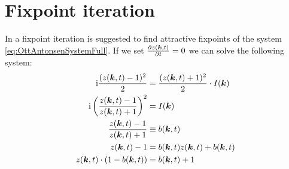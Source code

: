 %
%
%
%
%
%



\section{Fixpoint iteration}
In \cite{OttAntonsen2017} a fixpoint iteration is suggested to find attractive fixpoints of the system \eqref{eq:OttAntonsenSystemFull}. If we set $\frac{\partial z({\boldsymbol{k}}, t)}{\partial t} = 0$ we can solve the following system:
\begin{align}
{\rm{i}} \frac{(z({\boldsymbol{k}}, t)-1)^{2}}{2} &= \frac{(z({\boldsymbol{k}}, t)+1)^{2}}{2} \cdot I({\boldsymbol{k}}) \nonumber \\
{\rm{i}} \left(\frac{z({\boldsymbol{k}}, t)-1}{z({\boldsymbol{k}}, t)+1}\right)^2 &= I({\boldsymbol{k}}) \nonumber \\
\frac{z({\boldsymbol{k}}, t)-1}{z({\boldsymbol{k}}, t)+1} &\equiv b({\boldsymbol{k}},t) \nonumber \\
z({\boldsymbol{k}}, t) - 1 &= b({\boldsymbol{k}},t) z({\boldsymbol{k}}, t) + b({\boldsymbol{k}},t)  \nonumber \\
z({\boldsymbol{k}}, t) \cdot (1 - b({\boldsymbol{k}},t)) &= b({\boldsymbol{k}},t)  + 1\nonumber
\end{align}

